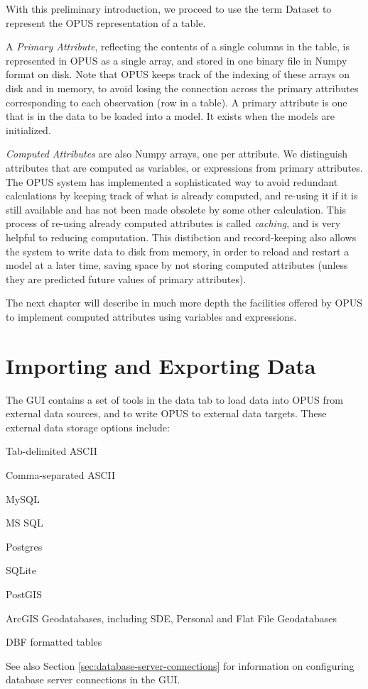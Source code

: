With this preliminary introduction, we proceed to use the term Dataset to represent the OPUS representation of a table. 

A \emph{Primary Attribute}, reflecting the contents of a single columns in the table, is represented in OPUS as a single array, and stored in one binary file in Numpy format on disk.  Note that OPUS keeps track of the indexing of these arrays on disk and in memory, to avoid losing the connection across the primary attributes corresponding to each observation (row in a table).  A primary attribute is one that is in the data to be loaded into a model.  It exists when the models are initialized.

\emph{Computed Attributes} are also Numpy arrays, one per attribute.  We distinguish attributes that are computed as variables, or expressions from primary attributes.  The OPUS system has implemented a sophisticated way to avoid redundant calculations by keeping track of what is already computed, and re-using it if it is still available and has not been made obsolete by some other calculation.  This process of re-using already computed attributes is called \emph{caching}, and is very helpful to reducing computation.  This distibction and record-keeping also allows the system to write data to disk from memory, in order to reload and restart a model at a later time, saving space by not storing computed attributes (unless they are predicted future values of primary attributes).

The next chapter will describe in much more depth the facilities offered by OPUS to implement computed attributes using variables and expressions.

\section{Importing and Exporting Data}

The GUI contains a set of tools in the data tab to load data into OPUS from external data sources, and to write OPUS to external data targets.  These external data storage options include:

\squishlist
\item Tab-delimited ASCII
\item Comma-separated ASCII
\item MySQL
\item MS SQL
\item Postgres
\item SQLite
\item PostGIS
\item ArcGIS Geodatabases, including SDE, Personal and Flat File Geodatabases
\item DBF formatted tables
\squishend

See also Section \ref{sec:database-server-connections} for information on configuring database server connections in the GUI.